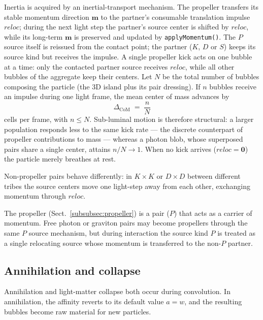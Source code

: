 \documentclass{ijuc}
\begin{document}
Inertia is acquired by an inertial-transport mechanism. The propeller transfers its stable momentum direction $\boldsymbol{m}$ to the partner's consumable translation impulse $\boldsymbol{\mathit{reloc}}$; during the next light step the partner's source center is shifted by $\boldsymbol{\mathit{reloc}}$, while its long-term $\boldsymbol{m}$ is preserved and updated by \texttt{applyMomentum()}.
The $P$ source itself is reissued from the contact point; the partner ($K$, $D$ or $S$) keeps its source kind but receives the impulse.
A single propeller kick acts on one bubble at a time: only the contacted partner source receives $\boldsymbol{\mathit{reloc}}$, while all other bubbles of the aggregate keep their centers. Let $N$ be the total number of bubbles composing the particle (the $3$D island plus its pair dressing). If $n$ bubbles receive an impulse during one light frame, the mean center of mass advances by
\begin{equation}
\Delta_{\mathrm{CoM}} \;=\; \frac{n}{N}
\end{equation}
cells per frame, with $n \leq N$. Sub-luminal motion is therefore structural: a larger population responds less to the same kick rate — the discrete counterpart of propeller contributions to mass — whereas a photon blob, whose superposed pairs share a single center, attains $n/N \to 1$. When no kick arrives ($\boldsymbol{\mathit{reloc}}=\boldsymbol{0}$) the particle merely breathes at rest.

Non-propeller pairs behave differently: in $K \times K$ or $D \times D$ between different tribes the source centers move one light-step away from each other, exchanging momentum through $\boldsymbol{\mathit{reloc}}$.

The propeller (Sect.~\ref{subsubsec:propeller}) is a pair ($P$) that acts as a carrier of momentum. Free photon or graviton pairs may become propellers through the same $P$ source mechanism, but during interaction the source kind $P$ is treated as a single relocating source whose momentum is transferred to the non-$P$ partner.

\subsection{Annihilation and collapse}

Annihilation and light-matter collapse both occur during convolution. In annihilation, the affinity reverts to its default value $a=w$, and the resulting bubbles become raw material for new particles.
\end{document}
